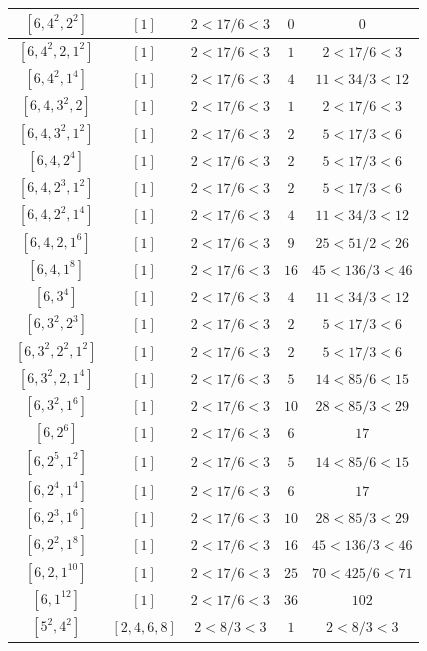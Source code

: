 \documentclass{article}%
\begin{document}
\begin{center}
\begin{longtable}{||c|c|c|c|c||}
$[6, 4^{2}, 2^{2}]$ & $[1]$ & $2 < 17/6 < 3$ & $0$ & $0$ \\ \hline 
$[6, 4^{2}, 2, 1^{2}]$ & $[1]$ & $2 < 17/6 < 3$ & $1$ & $2 < 17/6 < 3$ \\ \hline 
$[6, 4^{2}, 1^{4}]$ & $[1]$ & $2 < 17/6 < 3$ & $4$ & $11 < 34/3 < 12$ \\ \hline 
$[6, 4, 3^{2}, 2]$ & $[1]$ & $2 < 17/6 < 3$ & $1$ & $2 < 17/6 < 3$ \\ \hline 
$[6, 4, 3^{2}, 1^{2}]$ & $[1]$ & $2 < 17/6 < 3$ & $2$ & $5 < 17/3 < 6$ \\ \hline 
$[6, 4, 2^{4}]$ & $[1]$ & $2 < 17/6 < 3$ & $2$ & $5 < 17/3 < 6$ \\ \hline 
$[6, 4, 2^{3}, 1^{2}]$ & $[1]$ & $2 < 17/6 < 3$ & $2$ & $5 < 17/3 < 6$ \\ \hline 
$[6, 4, 2^{2}, 1^{4}]$ & $[1]$ & $2 < 17/6 < 3$ & $4$ & $11 < 34/3 < 12$ \\ \hline 
$[6, 4, 2, 1^{6}]$ & $[1]$ & $2 < 17/6 < 3$ & $9$ & $25 < 51/2 < 26$ \\ \hline 
$[6, 4, 1^{8}]$ & $[1]$ & $2 < 17/6 < 3$ & $16$ & $45 < 136/3 < 46$ \\ \hline 
$[6, 3^{4}]$ & $[1]$ & $2 < 17/6 < 3$ & $4$ & $11 < 34/3 < 12$ \\ \hline 
$[6, 3^{2}, 2^{3}]$ & $[1]$ & $2 < 17/6 < 3$ & $2$ & $5 < 17/3 < 6$ \\ \hline 
$[6, 3^{2}, 2^{2}, 1^{2}]$ & $[1]$ & $2 < 17/6 < 3$ & $2$ & $5 < 17/3 < 6$ \\ \hline 
$[6, 3^{2}, 2, 1^{4}]$ & $[1]$ & $2 < 17/6 < 3$ & $5$ & $14 < 85/6 < 15$ \\ \hline 
$[6, 3^{2}, 1^{6}]$ & $[1]$ & $2 < 17/6 < 3$ & $10$ & $28 < 85/3 < 29$ \\ \hline 
$[6, 2^{6}]$ & $[1]$ & $2 < 17/6 < 3$ & $6$ & $17$ \\ \hline 
$[6, 2^{5}, 1^{2}]$ & $[1]$ & $2 < 17/6 < 3$ & $5$ & $14 < 85/6 < 15$ \\ \hline 
$[6, 2^{4}, 1^{4}]$ & $[1]$ & $2 < 17/6 < 3$ & $6$ & $17$ \\ \hline 
$[6, 2^{3}, 1^{6}]$ & $[1]$ & $2 < 17/6 < 3$ & $10$ & $28 < 85/3 < 29$ \\ \hline 
$[6, 2^{2}, 1^{8}]$ & $[1]$ & $2 < 17/6 < 3$ & $16$ & $45 < 136/3 < 46$ \\ \hline 
$[6, 2, 1^{10}]$ & $[1]$ & $2 < 17/6 < 3$ & $25$ & $70 < 425/6 < 71$ \\ \hline 
$[6, 1^{12}]$ & $[1]$ & $2 < 17/6 < 3$ & $36$ & $102$ \\ \hline 
$[5^{2}, 4^{2}]$ & $[2, 4, 6, 8]$ & $2 < 8/3 < 3$ & $1$ & $2 < 8/3 < 3$ \\ \hline 

\end{longtable}
\end{center}
\end{document}
